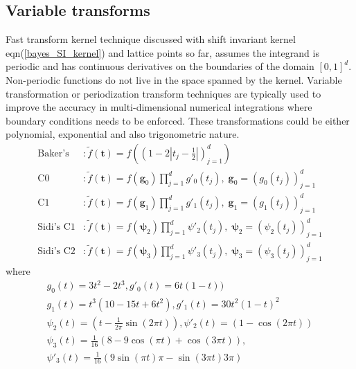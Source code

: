 \documentclass[twocolumn]{svjour3}          %
\newcommand{\bm}[1]{\boldsymbol{#1}}
\newcommand{\vg}{\bm{g}}
\newcommand{\vt}{\bm{t}}
\def\abs#1{\ensuremath{\left \lvert #1 \right \rvert}}
\begin{document}
\subsection{Variable transforms}
Fast transform kernel technique discussed with shift invariant kernel eqn(\ref{bayes_SI_kernel}) and lattice points so far, assumes the integrand is periodic and has continuous derivatives on the boundaries of the domain $[0,1]^d$. Non-periodic functions do not live in the space spanned by the kernel.
Variable transformation or periodization transform techniques are typically used to improve the accuracy in multi-dimensional numerical integrations where boundary conditions needs to be enforced. These transformations could be either polynomial, exponential and also trigonometric nature.
\begin{align*}
\text{Baker's} & : \tilde{f}(\vt) 
= f\left( \left(1-2 \abs{t_j-\frac{1}{2}} \right)_{j=1}^d \right) 
\\
\text{C0} & : \tilde{f}(\vt) 
= f\left( \vg_0 \right)\prod_{j=1}^d g'_0(t_j), 
  \; \vg_0 = \left( g_0(t_j) \right)_{j=1}^d
\\
\text{C1} & : \tilde{f}(\vt) 
= f\left( \vg_1\right)\prod_{j=1}^d g'_1(t_j),
  \; \vg_1 = \left( g_1(t_j) \right)_{j=1}^d 
\\
\text{Sidi's C1} & : \tilde{f}(\vt) 
= f\left( \bm{\psi}_2 \right) \prod_{j=1}^d \psi'_2(t_j),
  \; \bm{\psi}_2 = \left( {\psi}_2(t_j) \right)_{j=1}^d
\\
\text{Sidi's C2} & : \tilde{f}(\vt) 
= f\left( \bm{\psi}_3 \right) \prod_{j=1}^d \psi'_3(t_j),
  \; \bm{\psi}_3 = \left( {\psi}_3(t_j) \right)_{j=1}^d
\end{align*}
where
\begin{multline*}
g_0(t) = 3 t^2 - 2 t^3,   g'_0(t) = 6t(1-t))
\\
g_1(t) = t^3(10-15t+6t^2),   g'_1(t) = 30t^2(1-t)^2
\\
\psi_2(t) = 
\left(t - \frac{1}{2\pi} \sin(2\pi t) \right) 
,  \psi'_2(t) = 
\left(1 - \cos(2 \pi t)  \right) 
\\
\psi_3(t) = 
\frac{1}{16} \left(8-9\cos(\pi t)+ \cos(3\pi t) \right) 
, 
\\ 
\psi'_3(t) = 
\frac{1}{16} \left(9 \sin(\pi t) \pi - \sin(3 \pi t) 3 \pi \right) 
\end{multline*}
\end{document}

